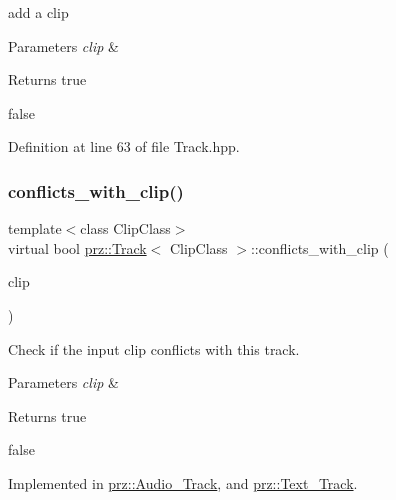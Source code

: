 add a clip 


\begin{DoxyParams}{Parameters}
{\em clip} & \\
\hline
\end{DoxyParams}
\begin{DoxyReturn}{Returns}
true 

false 
\end{DoxyReturn}


Definition at line 63 of file Track.\+hpp.

\mbox{\label{classprz_1_1_track_aefad1eca406d312dbafec624435b4420}} 
\subsubsection{\texorpdfstring{conflicts\_with\_clip()}{conflicts\_with\_clip()}}
{\footnotesize\ttfamily template$<$class Clip\+Class$>$ \\
virtual bool \mbox{\hyperlink{classprz_1_1_track}{prz\+::\+Track}}$<$ Clip\+Class $>$\+::conflicts\+\_\+with\+\_\+clip (\begin{DoxyParamCaption}\item[{Clip\+Class $\ast$}]{clip }\end{DoxyParamCaption})\hspace{0.3cm}{\ttfamily [pure virtual]}}



Check if the input clip conflicts with this track. 


\begin{DoxyParams}{Parameters}
{\em clip} & \\
\hline
\end{DoxyParams}
\begin{DoxyReturn}{Returns}
true 

false 
\end{DoxyReturn}


Implemented in \mbox{\hyperlink{classprz_1_1_audio___track_a6487c33aca7d2d496ca39037f5f75170}{prz\+::\+Audio\+\_\+\+Track}}, and \mbox{\hyperlink{classprz_1_1_text___track_af19070ff05eb7922539baa043441145c}{prz\+::\+Text\+\_\+\+Track}}.

